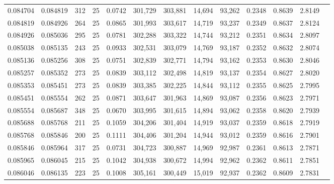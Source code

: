 \begin{tabular}{rrrrrrrrrrrrr}
0.084704 & 0.084819 &   312 &  25 &                                     0.0742 & 301,729 & 303,881 &  14,694 &  93,262 & 0.2348 & 0.8639 & 2.8149 \\
0.084819 & 0.084926 &   264 &  25 &                                     0.0865 & 301,993 & 303,617 &  14,719 &  93,237 & 0.2349 & 0.8637 & 2.8124 \\
0.084926 & 0.085036 &   295 &  25 &                                     0.0781 & 302,288 & 303,322 &  14,744 &  93,212 & 0.2351 & 0.8634 & 2.8097 \\
0.085038 & 0.085135 &   243 &  25 &                                     0.0933 & 302,531 & 303,079 &  14,769 &  93,187 & 0.2352 & 0.8632 & 2.8074 \\
0.085136 & 0.085256 &   308 &  25 &                                     0.0751 & 302,839 & 302,771 &  14,794 &  93,162 & 0.2353 & 0.8630 & 2.8046 \\
0.085257 & 0.085352 &   273 &  25 &                                     0.0839 & 303,112 & 302,498 &  14,819 &  93,137 & 0.2354 & 0.8627 & 2.8020 \\
0.085353 & 0.085451 &   273 &  25 &                                     0.0839 & 303,385 & 302,225 &  14,844 &  93,112 & 0.2355 & 0.8625 & 2.7995 \\
0.085451 & 0.085554 &   262 &  25 &                                     0.0871 & 303,647 & 301,963 &  14,869 &  93,087 & 0.2356 & 0.8623 & 2.7971 \\
0.085554 & 0.085687 &   348 &  25 &                                     0.0670 & 303,995 & 301,615 &  14,894 &  93,062 & 0.2358 & 0.8620 & 2.7939 \\
0.085688 & 0.085768 &   211 &  25 &                                     0.1059 & 304,206 & 301,404 &  14,919 &  93,037 & 0.2359 & 0.8618 & 2.7919 \\
0.085768 & 0.085846 &   200 &  25 &                                     0.1111 & 304,406 & 301,204 &  14,944 &  93,012 & 0.2359 & 0.8616 & 2.7901 \\
0.085846 & 0.085964 &   317 &  25 &                                     0.0731 & 304,723 & 300,887 &  14,969 &  92,987 & 0.2361 & 0.8613 & 2.7871 \\
0.085965 & 0.086045 &   215 &  25 &                                     0.1042 & 304,938 & 300,672 &  14,994 &  92,962 & 0.2362 & 0.8611 & 2.7851 \\
0.086046 & 0.086135 &   223 &  25 &                                     0.1008 & 305,161 & 300,449 &  15,019 &  92,937 & 0.2362 & 0.8609 & 2.7831 \\

\end{tabular}
